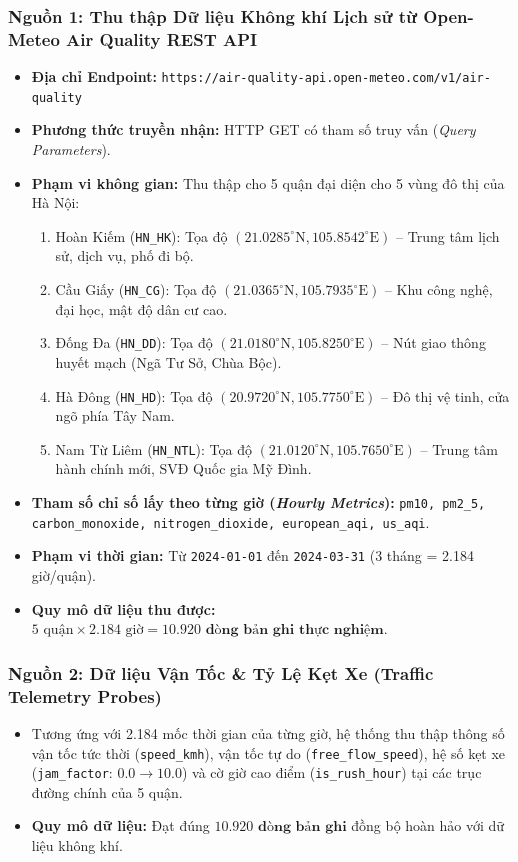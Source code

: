 \documentclass[12pt,a4paper]{article}
\begin{document}
\subsubsection{Nguồn 1: Thu thập Dữ liệu Không khí Lịch sử từ Open-Meteo Air Quality REST API}
\begin{itemize}
    \item \textbf{Địa chỉ Endpoint:} \texttt{https://air-quality-api.open-meteo.com/v1/air-quality}
    \item \textbf{Phương thức truyền nhận:} HTTP GET có tham số truy vấn (\textit{Query Parameters}).
    \item \textbf{Phạm vi không gian:} Thu thập cho 5 quận đại diện cho 5 vùng đô thị của Hà Nội:
    \begin{enumerate}
        \item Hoàn Kiếm (\texttt{HN\_HK}): Tọa độ $(21.0285^\circ\text{N}, 105.8542^\circ\text{E})$ -- Trung tâm lịch sử, dịch vụ, phố đi bộ.
        \item Cầu Giấy (\texttt{HN\_CG}): Tọa độ $(21.0365^\circ\text{N}, 105.7935^\circ\text{E})$ -- Khu công nghệ, đại học, mật độ dân cư cao.
        \item Đống Đa (\texttt{HN\_DD}): Tọa độ $(21.0180^\circ\text{N}, 105.8250^\circ\text{E})$ -- Nút giao thông huyết mạch (Ngã Tư Sở, Chùa Bộc).
        \item Hà Đông (\texttt{HN\_HD}): Tọa độ $(20.9720^\circ\text{N}, 105.7750^\circ\text{E})$ -- Đô thị vệ tinh, cửa ngõ phía Tây Nam.
        \item Nam Từ Liêm (\texttt{HN\_NTL}): Tọa độ $(21.0120^\circ\text{N}, 105.7650^\circ\text{E})$ -- Trung tâm hành chính mới, SVĐ Quốc gia Mỹ Đình.
    \end{enumerate}
    \item \textbf{Tham số chỉ số lấy theo từng giờ (\textit{Hourly Metrics}):}
    \texttt{pm10, pm2\_5, carbon\_monoxide, nitrogen\_dioxide, european\_aqi, us\_aqi}.
    \item \textbf{Phạm vi thời gian:} Từ \texttt{2024-01-01} đến \texttt{2024-03-31} (3 tháng = 2.184 giờ/quận).
    \item \textbf{Quy mô dữ liệu thu được:} $5 \text{ quận} \times 2.184 \text{ giờ} = \mathbf{10.920 \text{ dòng bản ghi thực nghiệm}}$.
\end{itemize}

\subsubsection{Nguồn 2: Dữ liệu Vận Tốc \& Tỷ Lệ Kẹt Xe (Traffic Telemetry Probes)}
\begin{itemize}
    \item Tương ứng với 2.184 mốc thời gian của từng giờ, hệ thống thu thập thông số vận tốc tức thời (\texttt{speed\_kmh}), vận tốc tự do (\texttt{free\_flow\_speed}), hệ số kẹt xe (\texttt{jam\_factor}: $0.0 \to 10.0$) và cờ giờ cao điểm (\texttt{is\_rush\_hour}) tại các trục đường chính của 5 quận.
    \item \textbf{Quy mô dữ liệu:} Đạt đúng $\mathbf{10.920 \text{ dòng bản ghi}}$ đồng bộ hoàn hảo với dữ liệu không khí.
\end{itemize}
\end{document}
